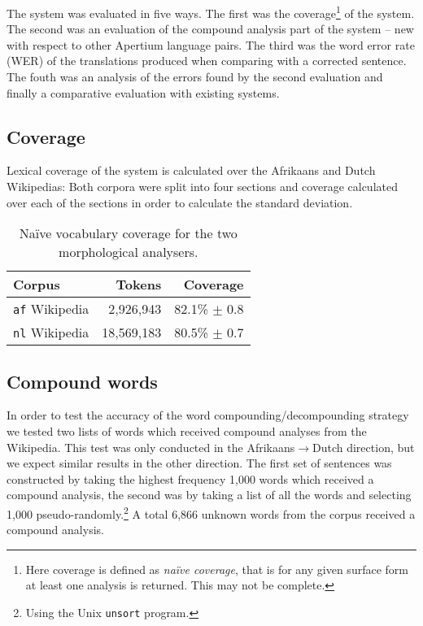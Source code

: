 \documentclass[11pt]{article}
\begin{document}
The system was evaluated in five ways. The first was the 
coverage\footnote{Here coverage is defined as \emph{na\"ive coverage}, 
that is for any given surface form at least one analysis is returned. This 
may not be complete.} of the system. The second was an evaluation of the 
compound analysis part of the system -- new with respect to other 
Apertium language pairs. The third was the word error 
rate (WER) of the translations produced when comparing with a 
corrected sentence. The fouth was an analysis of the errors found by the second
evaluation and finally a comparative evaluation with existing systems.

\subsection{Coverage}

Lexical coverage of the system is calculated over the Afrikaans and Dutch Wikipedias:
Both corpora were split into four sections and coverage calculated over each of the 
sections in order to calculate the standard deviation.

\begin{table}
  \begin{center}
  \begin{tabular}{|l|r|r|}
   \hline
   {\bf Corpus}           & {\bf Tokens}    & {\bf Coverage}\\
   \hline
   {\tt af} Wikipedia     & 2,926,943       & 82.1\% $\pm$ 0.8 \\
   \hline
   {\tt nl} Wikipedia     & 18,569,183      & 80.5\% $\pm$ 0.7 \\
   \hline
  \end{tabular}
    \caption{Na\"ive vocabulary coverage for the two morphological analysers.}
    \label{table:coverage}
  \end{center}
\end{table}

\subsection{Compound words}

In order to test the accuracy of the word compounding/decompounding strategy
we tested two lists of words which received compound analyses from 
the Wikipedia. This test was only conducted in the Afrikaans$\rightarrow$Dutch
direction, but we expect similar results in the other direction. The first
set of sentences was constructed by taking the highest frequency 1,000 words which received 
a compound analysis, the second was by taking a list of all the words and selecting
1,000 pseudo-randomly.\footnote{Using the Unix {\small {\tt unsort}} program.} A total 
6,866 unknown words from the corpus received a compound analysis.
\end{document}
